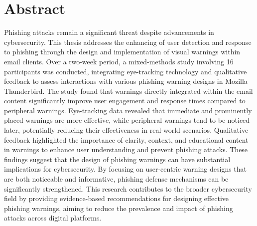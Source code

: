 \documentclass[
  a4paper,  %
  twoside,  %
  bibliography=totoc,
  headsepline,
  cleardoublepage=empty,
  parskip=half,
  draft=false
]{scrbook}
\begin{document}

\cleardoublepage

\section*{Abstract} 
Phishing attacks remain a significant threat despite advancements in cybersecurity. This thesis addresses the enhancing of user detection and response to phishing through the design and implementation of visual warnings within email clients. Over a two-week period, a mixed-methods study involving 16 participants was conducted, integrating eye-tracking technology and qualitative feedback to assess interactions with various phishing warning designs in Mozilla Thunderbird. \newline
The study found that warnings directly integrated within the email content significantly improve user engagement and response times compared to peripheral warnings. Eye-tracking data revealed that immediate and prominently placed warnings are more effective, while peripheral warnings tend to be noticed later, potentially reducing their effectiveness in real-world scenarios. Qualitative feedback highlighted the importance of clarity, context, and educational content in warnings to enhance user understanding and prevent phishing attacks. \newline
These findings suggest that the design of phishing warnings can have substantial implications for cybersecurity. By focusing on user-centric warning designs that are both noticeable and informative, phishing defense mechanisms can be significantly strengthened. This research contributes to the broader cybersecurity field by providing evidence-based recommendations for designing effective phishing warnings, aiming to reduce the prevalence and impact of phishing attacks across digital platforms.



\end{document}
